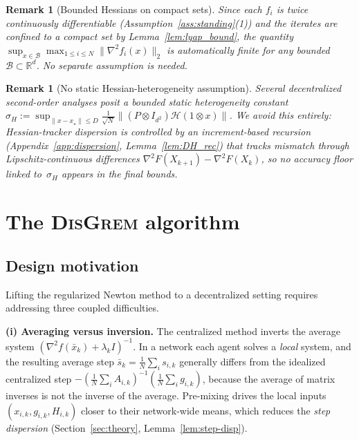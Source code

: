 \documentclass[11pt,a4paper]{article}
\def\one{1}%
\def\J{J}%
\def\Pmat{P}%
\newtheorem{remark}[theorem]{Remark}
\newcommand{\R}{\mathbb{R}}
\newcommand{\one}{\mathbf{1}}
\newcommand{\J}{\left(\frac{1}{N}\one\one^\top\right)}
\newcommand{\Pmat}{I-\J}
\begin{document}
	\begin{remark}[Bounded Hessians on compact sets]
		Since each $f_i$ is twice continuously differentiable (Assumption~\ref{ass:standing}(1))
		and the iterates are confined to a compact set by Lemma~\ref{lem:lyap_bound},
		the quantity $\sup_{x\in\mathcal B}\max_{1\le i\le N}\|\nabla^2 f_i(x)\|_2$
		is automatically finite for any bounded $\mathcal B\subset\R^d$.
		No separate assumption is needed.
	\end{remark}

	\begin{remark}[No static Hessian-heterogeneity assumption]
		Several decentralized second-order analyses posit a bounded
		\emph{static} heterogeneity constant
		$\sigma_H:=\sup_{\|x-x_\star\|\le D}
		  \frac{1}{\sqrt N}\|(\Pmat\otimes I_{d^2})\mathcal H(\one\otimes x)\|$.
		We avoid this entirely: Hessian-tracker dispersion is controlled
		by an increment-based recursion
		(Appendix~\ref{app:dispersion}, Lemma~\ref{lem:DH_rec})
		that tracks mismatch through Lipschitz-continuous
		\emph{differences} $\nabla^2 F(X_{k+1})-\nabla^2 F(X_k)$,
		so no accuracy floor linked to~$\sigma_H$ appears in the
		final bounds.
	\end{remark}

	
	
\section{The \textsc{DisGrem} algorithm}\label{sec:alg}
	
	\subsection{Design motivation}\label{ssec:design}
	
	Lifting the regularized Newton method to a decentralized setting
	requires addressing three coupled difficulties.
	
	\textbf{(i) Averaging versus inversion.}
	The centralized method inverts the average system
	$(\nabla^2 f(\bar x_k)+\lambda_k I)^{-1}$.
	In a network each agent solves a \emph{local} system, and the
	resulting average step
	$\bar s_k=\frac1N\sum_i s_{i,k}$ generally differs from the
	idealized centralized step
	$-(\frac1N\sum_i A_{i,k})^{-1}(\frac1N\sum_i g_{i,k})$,
	because the average of matrix inverses is not the inverse of
	the average.
	Pre-mixing drives the local inputs
	$(x_{i,k},g_{i,k},H_{i,k})$ closer to their network-wide means,
	which reduces the \emph{step dispersion}
	(Section~\ref{sec:theory}, Lemma~\ref{lem:step-disp}).
	
\end{document}
